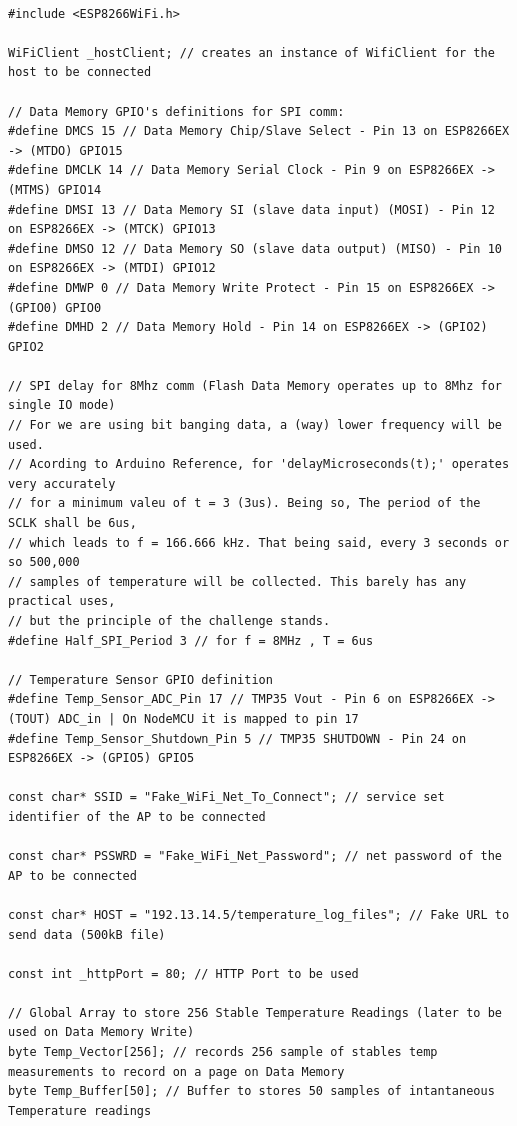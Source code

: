 \begin{lstlisting}[language=Arduino]

#include <ESP8266WiFi.h>

WiFiClient _hostClient; // creates an instance of WifiClient for the host to be connected

// Data Memory GPIO's definitions for SPI comm:
#define DMCS 15 // Data Memory Chip/Slave Select - Pin 13 on ESP8266EX -> (MTDO) GPIO15
#define DMCLK 14 // Data Memory Serial Clock - Pin 9 on ESP8266EX -> (MTMS) GPIO14
#define DMSI 13 // Data Memory SI (slave data input) (MOSI) - Pin 12 on ESP8266EX -> (MTCK) GPIO13
#define DMSO 12 // Data Memory SO (slave data output) (MISO) - Pin 10 on ESP8266EX -> (MTDI) GPIO12
#define DMWP 0 // Data Memory Write Protect - Pin 15 on ESP8266EX -> (GPIO0) GPIO0
#define DMHD 2 // Data Memory Hold - Pin 14 on ESP8266EX -> (GPIO2) GPIO2

// SPI delay for 8Mhz comm (Flash Data Memory operates up to 8Mhz for single IO mode)
// For we are using bit banging data, a (way) lower frequency will be used.
// Acording to Arduino Reference, for 'delayMicroseconds(t);' operates very accurately 
// for a minimum valeu of t = 3 (3us). Being so, The period of the SCLK shall be 6us,
// which leads to f = 166.666 kHz. That being said, every 3 seconds or so 500,000
// samples of temperature will be collected. This barely has any practical uses,
// but the principle of the challenge stands.
#define Half_SPI_Period 3 // for f = 8MHz , T = 6us

// Temperature Sensor GPIO definition
#define Temp_Sensor_ADC_Pin 17 // TMP35 Vout - Pin 6 on ESP8266EX -> (TOUT) ADC_in | On NodeMCU it is mapped to pin 17
#define Temp_Sensor_Shutdown_Pin 5 // TMP35 SHUTDOWN - Pin 24 on ESP8266EX -> (GPIO5) GPIO5

const char* SSID = "Fake_WiFi_Net_To_Connect"; // service set identifier of the AP to be connected

const char* PSSWRD = "Fake_WiFi_Net_Password"; // net password of the AP to be connected

const char* HOST = "192.13.14.5/temperature_log_files"; // Fake URL to send data (500kB file)

const int _httpPort = 80; // HTTP Port to be used

// Global Array to store 256 Stable Temperature Readings (later to be used on Data Memory Write)
byte Temp_Vector[256]; // records 256 sample of stables temp measurements to record on a page on Data Memory
byte Temp_Buffer[50]; // Buffer to stores 50 samples of intantaneous Temperature readings


\end{lstlisting}
